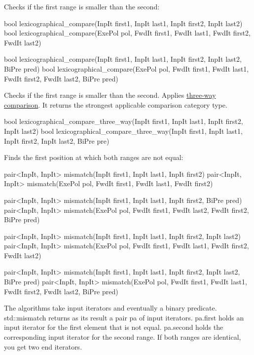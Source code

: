 Checks if the first range is smaller than the second:

\begin{cpp}
bool lexicographical_compare(InpIt first1, InpIt last1,
							 InpIt first2, InpIt last2)
bool lexicographical_compare(ExePol pol, FwdIt first1, FwdIt last1,
							 FwdIt first2, FwdIt last2)
							 
bool lexicographical_compare(InpIt first1, InpIt last1,
							 InpIt first2, InpIt last2, BiPre pred)
bool lexicographical_compare(ExePol pol, FwdIt first1, FwdIt last1,
							 FwdIt first2, FwdIt last2, BiPre pred)
\end{cpp}

Checks if the first range is smaller than the second. Applies \href{https://en.cppreference.com/w/cpp/language/operator_comparison}{three-way comparison}. It returns the strongest applicable comparison category type.

\begin{cpp}
bool lexicographical_compare_three_way(InpIt first1, InpIt last1,
									   InpIt first2, InpIt last2)
bool lexicographical_compare_three_way(InpIt first1, InpIt last1,
									   InpIt first2, InpIt last2,
									   BiPre pre)
\end{cpp}

Finds the first position at which both ranges are not equal:

\begin{cpp}
pair<InpIt, InpIt> mismatch(InpIt first1, InpIt last1,
							InpIt first2)
pair<InpIt, InpIt> mismatch(ExePol pol, FwdIt first1, FwdIt last1,
							FwdIt first2)
							
pair<InpIt, InpIt> mismatch(InpIt first1, InpIt last1,
							InpIt first2, BiPre pred)
pair<InpIt, InpIt> mismatch(ExePol pol, FwdIt first1, FwdIt last2,
							FwdIt first2, BiPre pred)
							
pair<InpIt, InpIt> mismatch(InpIt first1, InpIt last1,
							InpIt first2, InpIt last2)
pair<InpIt, InpIt> mismatch(ExePol pol, FwdIt first1, FwdIt last1,
							FwdIt first2, FwdIt last2)
							
pair<InpIt, InpIt> mismatch(InpIt first1, InpIt last1,
							InpIt first2, InpIt last2, BiPre pred)
pair<InpIt, InpIt> mismatch(ExePol pol, FwdIt first1, FwdIt last1,
							FwdIt first2, FwdIt last2, BiPre pred)
\end{cpp}

The algorithms take input iterators and eventually a binary predicate. std::mismatch returns as its result a pair pa of input iterators. pa.first holds an input iterator for the first element that is not equal. pa.second holds the corresponding input iterator for the second range. If both ranges are identical, you get two end iterators.

